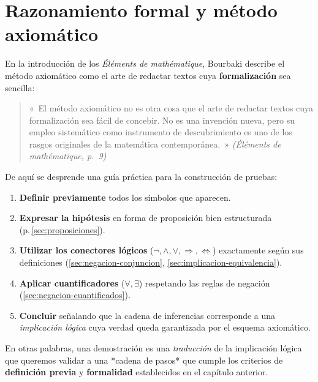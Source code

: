 
\section{Razonamiento formal y método axiomático}
\label{subsec:razonamiento-bourbaki}

En la introducción de los \emph{Éléments de mathématique}, Bourbaki describe
el método axiomático como el arte de redactar textos cuya
\textbf{formalización} sea sencilla:

\begin{quote}
  « El método axiomático no es otra cosa que el arte de redactar textos
  cuya formalización sea fácil de concebir.  No es una invención nueva,
  pero su empleo sistemático como instrumento de descubrimiento es uno
  de los rasgos originales de la matemática contemporánea. »
  \hfill \textit{(Éléments de mathématique, p.~9)}
\end{quote}

De aquí se desprende una guía práctica para la construcción de pruebas:

\begin{enumerate}
  \item \textbf{Definir previamente} todos los símbolos que aparecen.
  \item \textbf{Expresar la hipótesis} en forma de proposición bien
        estructurada (p. \ref{sec:proposiciones}).
  \item \textbf{Utilizar los conectores lógicos} (\(\neg,\wedge,\vee,\Rightarrow,\Leftrightarrow\))
        exactamente según sus definiciones (\ref{sec:negacion-conjuncion}, \ref{sec:implicacion-equivalencia}).
  \item \textbf{Aplicar cuantificadores} (\(\forall,\exists\)) respetando las reglas de
        negación (\ref{sec:negacion-cuantificados}).
  \item \textbf{Concluir} señalando que la cadena de inferencias corresponde
        a una \emph{implicación lógica} cuya verdad queda garantizada
        por el esquema axiomático.
\end{enumerate}

En otras palabras, una demostración es una \emph{traducción} de la
implicación lógica que queremos validar a una *cadena de pasos* que
cumple los criterios de \textbf{definición previa} y \textbf{formalidad}
establecidos en el capítulo anterior.

